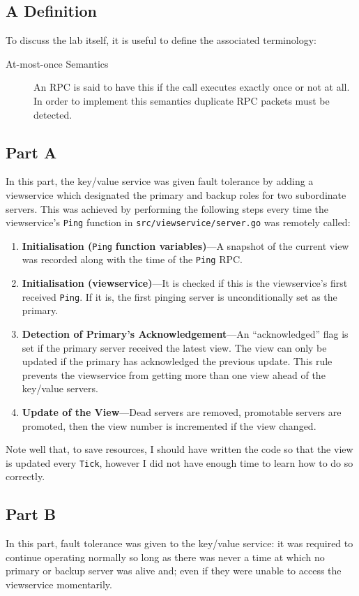 \documentclass[11pt,a4paper]{report}
\begin{document}
	\subsection{A Definition}
	To discuss the lab itself, it is useful to define the associated terminology:
	\begin{description}
	\item[At-most-once Semantics] An RPC is said to have this if the call executes exactly once or not at all. In order to implement this semantics duplicate RPC packets must be detected.
	\end{description}
	
	\subsection{Part A}
	In this part, the key/value service was given fault tolerance by adding a viewservice which designated the primary and backup roles for two subordinate servers. This was achieved by performing the following steps every time the viewservice's \verb|Ping| function in \verb|src/viewservice/server.go| was remotely called:
	\begin{enumerate}
		\item \textbf{Initialisation (}\verb|Ping|\textbf{ function variables)}---A snapshot of the current view was recorded along with the time of the \verb|Ping| RPC.
		\item \textbf{Initialisation (viewservice)}---It is checked if this is the viewservice's first received \verb|Ping|. If it is, the first pinging server is unconditionally set as the primary.
		\item \textbf{Detection of Primary's Acknowledgement}---An ``acknowledged'' flag is set if the primary server received the latest view. The view can only be updated if the primary has acknowledged the previous update. This rule prevents the viewservice from getting more than one view ahead of the key/value servers.
		\item \textbf{Update of the View}---Dead servers are removed, promotable servers are promoted, then the view number is incremented if the view changed.
	\end{enumerate}
	Note well that, to save resources, I should have written the code so that the view is updated every \verb|Tick|, however I did not have enough time to learn how to do so correctly.
	
	\subsection{Part B}
	In this part, fault tolerance was given to the key/value service: it was required to continue operating normally so long as there was never a time at which no primary or backup server was alive and; even if they were unable to access the viewservice momentarily.
	
\end{document}
